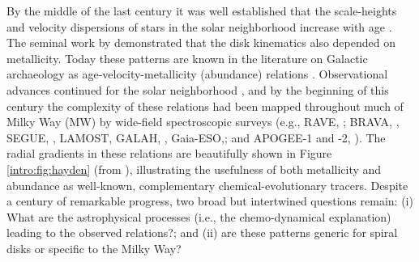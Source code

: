 By the middle of the last century it was well established that the
scale-heights and velocity dispersions of stars in the solar
neighborhood increase with age \citep[see][for a summary of this early
work, particularly the chapters contributed by Elvius and
Delhaye]{Blaauw65}. The seminal work by \citet{Roman50} demonstrated
that the disk kinematics also depended on metallicity.  Today these
patterns are known in the literature on Galactic archaeology as
age-velocity-metallicity (abundance) relations \citep[AVM$\alpha$-R;
e.g.,][]{Aumer09,Minchev14}. Observational advances continued for the
solar neighborhood \citep[e.g.,][]{Edvardsson93, Dehnen98,
  Nordstrom04}, and by the beginning of this century the complexity of
these relations had been mapped throughout much of Milky Way (MW) by
wide-field spectroscopic surveys (e.g., RAVE, \citealt{steinmetz06a};
BRAVA, \citealt{howard08a}, SEGUE, \citealt{yanny09a}, LAMOST,
\citealt{zhao12a} GALAH, \citealt{desilva15a},
Gaia-ESO,\citealt{gilmore12a}; and APOGEE-1 and -2,
\citealt{Majewski15}). The radial gradients in these relations are
beautifully shown in Figure \ref{intro:fig:hayden} (from
\citet{Hayden15}), illustrating the usefulness of both metallicity and
abundance as well-known, complementary chemical-evolutionary
tracers. Despite a century of remarkable progress, two broad but
intertwined questions remain: (i) What are the astrophysical processes
(i.e., the chemo-dynamical explanation) leading to the observed
relations?; and (ii) are these patterns generic for spiral disks or
specific to the Milky Way?

